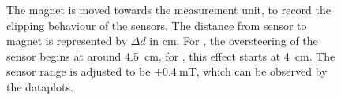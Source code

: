 \begin{figure}
\hfill
{}
\caption{The magnet is moved towards the measurement unit, to record the clipping behaviour of the sensors. The distance from sensor to magnet is represented by $ \Delta d $ in \si{\cm}. For \label{fig:negClip}, the oversteering of the sensor begins at around \SI{4.5}{\cm}, for \label{fig:posClip}, this effect starts at \SI{4}{\cm}. The sensor range is adjusted to be $ \pm \SI{0.4}{\milli \tesla} $, which can be observed by the dataplots.}
\label{fig:clipping}
\end{figure}


